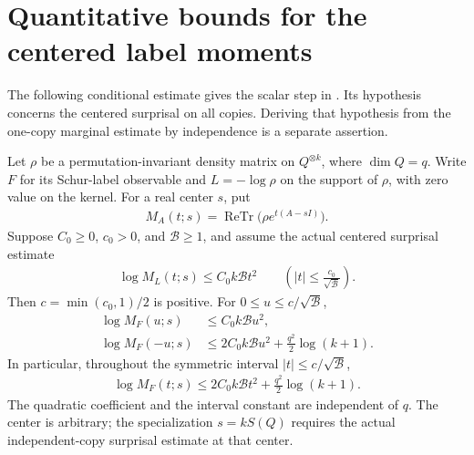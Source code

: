 \section{Quantitative bounds for the centered label moments}
\label{sec:schur-label-moment-bounds}

The following conditional estimate gives the scalar step in
\cite[Section~7, lines~227--238]{OpenAI2026AreaLaw}. Its hypothesis concerns
the centered surprisal on all copies. Deriving that hypothesis from the
one-copy marginal estimate by independence is a separate assertion.

\begin{theorem}
\label{thm:schur-label-moment-bounds}
\leanok
Let $\rho$ be a permutation-invariant density matrix on $Q^{\otimes k}$,
where $\dim Q=q$. Write $F$ for its Schur-label observable and $L=-\log\rho$
on the support of $\rho$, with zero value on the kernel. For a real center
$s$, put
\begin{align*}
 M_A(t;s)=\operatorname{ReTr}\bigl(\rho e^{t(A-sI)}\bigr).
\end{align*}
Suppose $C_0\ge0$, $c_0>0$, and $\mathcal B\ge1$, and assume the actual
centered surprisal estimate
\begin{align*}
 \log M_L(t;s)\le C_0k\mathcal B t^2
 \qquad\left(|t|\le\frac{c_0}{\sqrt{\mathcal B}}\right).
\end{align*}
Then $c=\min(c_0,1)/2$ is positive. For $0\le u\le c/\sqrt{\mathcal B}$,
\begin{align*}
 \log M_F(u;s)&\le C_0k\mathcal B u^2,\\
 \log M_F(-u;s)&\le 2C_0k\mathcal B u^2
                  +\frac{q^2}{2}\log(k+1).
\end{align*}
In particular, throughout the symmetric interval
$|t|\le c/\sqrt{\mathcal B}$,
\begin{align*}
 \log M_F(t;s)\le 2C_0k\mathcal B t^2
                      +\frac{q^2}{2}\log(k+1).
\end{align*}
The quadratic coefficient and the interval constant are independent of $q$.
The center is arbitrary; the specialization $s=kS(Q)$ requires the actual
independent-copy surprisal estimate at that center.
\end{theorem}

